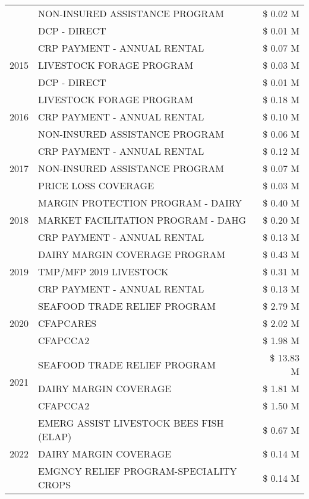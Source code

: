 \begin{tabular}{llr}
 & NON-INSURED ASSISTANCE PROGRAM & \$ 0.02 M \\
 & DCP - DIRECT & \$ 0.01 M \\
\cline{1-3}
\multirow[t]{3}{*}{2015} & CRP PAYMENT - ANNUAL RENTAL & \$ 0.07 M \\
 & LIVESTOCK FORAGE PROGRAM & \$ 0.03 M \\
 & DCP - DIRECT & \$ 0.01 M \\
\cline{1-3}
\multirow[t]{3}{*}{2016} & LIVESTOCK FORAGE PROGRAM & \$ 0.18 M \\
 & CRP PAYMENT - ANNUAL RENTAL & \$ 0.10 M \\
 & NON-INSURED ASSISTANCE PROGRAM & \$ 0.06 M \\
\cline{1-3}
\multirow[t]{3}{*}{2017} & CRP PAYMENT - ANNUAL RENTAL & \$ 0.12 M \\
 & NON-INSURED ASSISTANCE PROGRAM & \$ 0.07 M \\
 & PRICE LOSS COVERAGE & \$ 0.03 M \\
\cline{1-3}
\multirow[t]{3}{*}{2018} & MARGIN PROTECTION PROGRAM - DAIRY & \$ 0.40 M \\
 & MARKET FACILITATION PROGRAM - DAHG & \$ 0.20 M \\
 & CRP PAYMENT - ANNUAL RENTAL & \$ 0.13 M \\
\cline{1-3}
\multirow[t]{3}{*}{2019} & DAIRY MARGIN COVERAGE PROGRAM & \$ 0.43 M \\
 & TMP/MFP 2019 LIVESTOCK & \$ 0.31 M \\
 & CRP PAYMENT - ANNUAL RENTAL & \$ 0.13 M \\
\cline{1-3}
\multirow[t]{3}{*}{2020} & SEAFOOD TRADE RELIEF PROGRAM & \$ 2.79 M \\
 & CFAPCARES & \$ 2.02 M \\
 & CFAPCCA2 & \$ 1.98 M \\
\cline{1-3}
\multirow[t]{3}{*}{2021} & SEAFOOD TRADE RELIEF PROGRAM & \$ 13.83 M \\
 & DAIRY MARGIN COVERAGE & \$ 1.81 M \\
 & CFAPCCA2 & \$ 1.50 M \\
\cline{1-3}
\multirow[t]{3}{*}{2022} & EMERG ASSIST LIVESTOCK BEES FISH (ELAP) & \$ 0.67 M \\
 & DAIRY MARGIN COVERAGE & \$ 0.14 M \\
 & EMGNCY RELIEF PROGRAM-SPECIALITY CROPS & \$ 0.14 M \\
\cline{1-3}
\bottomrule
\end{tabular}
